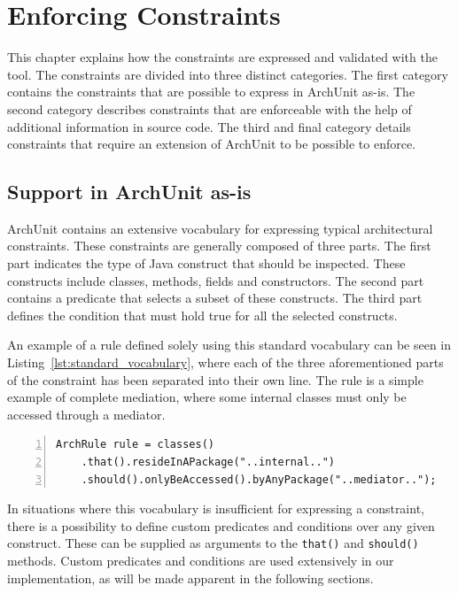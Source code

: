 \chapter{Enforcing Constraints}

This chapter explains how the constraints are expressed and validated with the tool. The constraints are divided into three distinct categories. The first category contains the constraints that are possible to express in ArchUnit as-is. The second category describes constraints that are enforceable with the help of additional information in source code. The third and final category details constraints that require an extension of ArchUnit to be possible to enforce.

\section{Support in ArchUnit as-is}\label{sec:as-is}

ArchUnit contains an extensive vocabulary for expressing typical architectural constraints. These constraints are generally composed of three parts. The first part indicates the type of Java construct that should be inspected. These constructs include classes, methods, fields and constructors. The second part contains a predicate that selects a subset of these constructs. The third part defines the condition that must hold true for all the selected constructs.

An example of a rule defined solely using this standard vocabulary can be seen in Listing~\ref{lst:standard_vocabulary}, where each of the three aforementioned parts of the constraint has been separated into their own line. The rule is a simple example of complete mediation, where some internal classes must only be accessed through a mediator.

\begin{minipage}{\linewidth}
\begin{lstlisting}[caption={Example of a rule that is expressed with the standard vocabulary.}, captionpos=b, label=lst:standard_vocabulary, numbers=left]
ArchRule rule = classes()
    .that().resideInAPackage("..internal..")
    .should().onlyBeAccessed().byAnyPackage("..mediator..");
\end{lstlisting}
\end{minipage}

In situations where this vocabulary is insufficient for expressing a constraint, there is a possibility to define custom predicates and conditions over any given construct. These can be supplied as arguments to the \texttt{that()} and \texttt{should()} methods. Custom predicates and conditions are used extensively in our implementation, as will be made apparent in the following sections.


